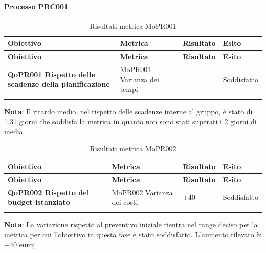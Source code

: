 \documentclass[../piano-di-qualifica.tex]{subfiles}
\begin{document}
\paragraph{Processo PRC001}
\label{sub:processo_PRC001}

\renewcommand{\arraystretch}{2} %
\begin{longtable}[H]{>{\centering\bfseries}m{5cm} >{\centering}m{5cm} >{\centering}m{2.5cm} >{\centering\arraybackslash}m{2.5cm}}  
  \rowcolor{lightgray}
  {\textbf{Obiettivo}} & {\textbf{Metrica}} & {\textbf{Risultato}} & {\textbf{Esito}}  \\
  \endfirsthead%
  \rowcolor{lightgray}
  {\textbf{Obiettivo}} & {\textbf{Metrica}} & {\textbf{Risultato}} & {\textbf{Esito}}  \\
  \endhead%
  \textbf{QoPR001 Rispetto delle scadenze della pianificazione} & MoPR001 Varianza dei tempi & 1.31 & Soddisfatto \\
  \caption{Risultati metrica MoPR001}
  \label{tab:my-table}
\end{longtable}
\textbf{Nota}: Il ritardo medio, nel rispetto delle scadenze interne al gruppo, è stato di 1.31 giorni che soddisfa la metrica in quanto non sono stati superati i 2 giorni di media.

\renewcommand{\arraystretch}{2} %
\begin{longtable}[H]{>{\centering\bfseries}m{5cm} >{\centering}m{5cm} >{\centering}m{2.5cm} >{\centering\arraybackslash}m{2.5cm}}  
  \rowcolor{lightgray}
  {\textbf{Obiettivo}} & {\textbf{Metrica}} & {\textbf{Risultato}} & {\textbf{Esito}}  \\
  \endfirsthead%
  \rowcolor{lightgray}
  {\textbf{Obiettivo}} & {\textbf{Metrica}} & {\textbf{Risultato}} & {\textbf{Esito}}  \\
  \endhead%
  \textbf{QoPR002 Rispetto del budget istanziato} & MoPR002 Varianza dei costi & +40 & Soddisfatto \\
  \caption{Risultati metrica MoPR002}
  \label{tab:my-table}
\end{longtable}
\textbf{Nota}: La variazione rispetto al preventivo iniziale rientra nel range deciso per la metrica per cui l'obiettivo in questa fase è stato soddisfatto. L'aumento rilevato è: +40 euro;
\end{document}
